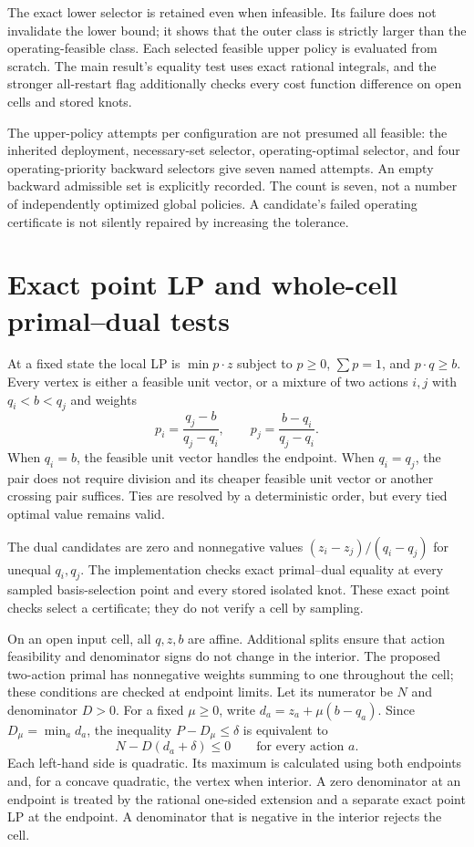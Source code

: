 The exact lower selector is retained even when infeasible. Its failure does not invalidate the lower bound; it shows that the outer class is strictly larger than the operating-feasible class. Each selected feasible upper policy is evaluated from scratch. The main result's equality test uses exact rational integrals, and the stronger all-restart flag additionally checks every cost function difference on open cells and stored knots.

The upper-policy attempts per configuration are not presumed all feasible: the inherited deployment, necessary-set selector, operating-optimal selector, and four operating-priority backward selectors give seven named attempts. An empty backward admissible set is explicitly recorded. The count is seven, not a number of independently optimized global policies. A candidate's failed operating certificate is not silently repaired by increasing the tolerance.

\section{Exact point LP and whole-cell primal--dual tests}
At a fixed state the local LP is $\min p\cdot z$ subject to $p\geq0$, $\sum p=1$, and $p\cdot q\geq b$. Every vertex is either a feasible unit vector, or a mixture of two actions $i,j$ with $q_i<b<q_j$ and weights
\[
 p_i=\frac{q_j-b}{q_j-q_i},\qquad p_j=\frac{b-q_i}{q_j-q_i}.
\]
When $q_i=b$, the feasible unit vector handles the endpoint. When $q_i=q_j$, the pair does not require division and its cheaper feasible unit vector or another crossing pair suffices. Ties are resolved by a deterministic order, but every tied optimal value remains valid.

The dual candidates are zero and nonnegative values $(z_i-z_j)/(q_i-q_j)$ for unequal $q_i,q_j$. The implementation checks exact primal--dual equality at every sampled basis-selection point and every stored isolated knot. These exact point checks select a certificate; they do not verify a cell by sampling.

On an open input cell, all $q,z,b$ are affine. Additional splits ensure that action feasibility and denominator signs do not change in the interior. The proposed two-action primal has nonnegative weights summing to one throughout the cell; these conditions are checked at endpoint limits. Let its numerator be $N$ and denominator $D>0$. For a fixed $\mu\geq0$, write $d_a=z_a+\mu(b-q_a)$. Since $D_\mu=\min_a d_a$, the inequality $P-D_\mu\leq\delta$ is equivalent to
\[
 N-D(d_a+\delta)\leq0\qquad\text{for every action }a.
\]
Each left-hand side is quadratic. Its maximum is calculated using both endpoints and, for a concave quadratic, the vertex when interior. A zero denominator at an endpoint is treated by the rational one-sided extension and a separate exact point LP at the endpoint. A denominator that is negative in the interior rejects the cell.

